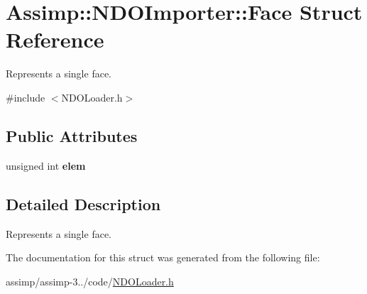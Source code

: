\hypertarget{struct_assimp_1_1_n_d_o_importer_1_1_face}{\section{Assimp\+:\+:N\+D\+O\+Importer\+:\+:Face Struct Reference}
\label{struct_assimp_1_1_n_d_o_importer_1_1_face}
}


Represents a single face.  




{\ttfamily \#include $<$N\+D\+O\+Loader.\+h$>$}

\subsection*{Public Attributes}
\begin{DoxyCompactItemize}
\item 
\hypertarget{struct_assimp_1_1_n_d_o_importer_1_1_face_a05c912f12edc06d20b234497004f3147}{unsigned int {\bfseries elem}}\label{struct_assimp_1_1_n_d_o_importer_1_1_face_a05c912f12edc06d20b234497004f3147}

\end{DoxyCompactItemize}


\subsection{Detailed Description}
Represents a single face. 

The documentation for this struct was generated from the following file\+:\begin{DoxyCompactItemize}
\item 
assimp/assimp-\/3../code/\hyperlink{_n_d_o_loader_8h}{N\+D\+O\+Loader.\+h}\end{DoxyCompactItemize}
